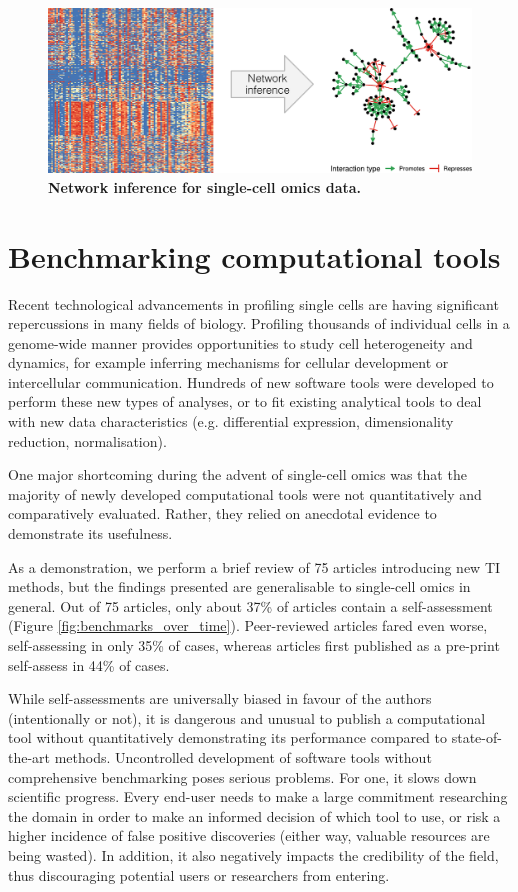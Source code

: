 \begin{figure}[htb!]
	\centering
	\includegraphics[width=.6\linewidth]{fig/comptools2/comptool_5_networkinference.pdf}
	\caption{
		\textbf{Network inference for single-cell omics data.}
	}
	\label{fig:comp_tools_ni}
\end{figure}

\section{Benchmarking computational tools}

Recent technological advancements in profiling single cells are having significant repercussions in many fields of biology. Profiling thousands of individual cells in a genome-wide manner provides opportunities to study cell heterogeneity and dynamics, for example inferring mechanisms for cellular development or intercellular communication. 
Hundreds of new software tools were developed \cite{zappia_exploringsinglecellrnaseq_2018} to perform these new types of analyses, or to fit existing analytical tools to deal with new data characteristics (e.g. differential expression, dimensionality reduction, normalisation). 

One major shortcoming during the advent of single-cell omics was that the majority of newly developed computational tools were not quantitatively and comparatively evaluated. Rather, they relied on anecdotal evidence to demonstrate its usefulness. 

As a demonstration, we perform a brief review of 75 articles introducing new TI methods, but the findings presented are generalisable to single-cell omics in general. Out of 75 articles, only about 37\% of articles contain a self-assessment (Figure \ref{fig:benchmarks_over_time}). Peer-reviewed articles fared even worse, self-assessing in only 35\% of cases, whereas articles first published as a pre-print self-assess in 44\% of cases.

While self-assessments are universally biased in favour of the authors \cite{norel_selfassessmenttrapcan_2011} (intentionally or not), it is dangerous and unusual to publish a computational tool without quantitatively demonstrating its performance compared to state-of-the-art methods. Uncontrolled development of software tools without comprehensive benchmarking poses serious problems. For one, it slows down scientific progress. Every end-user needs to make a large commitment researching the domain in order to make an informed decision of which tool to use, or risk a higher incidence of false positive discoveries (either way, valuable resources are being wasted). In addition, it also negatively impacts the credibility of the field, thus discouraging potential users or researchers from entering.

